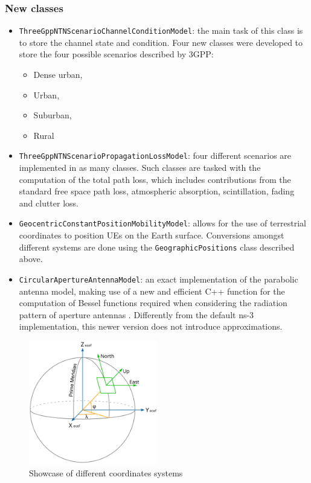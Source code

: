 \subsubsection{New classes}
\begin{itemize}
    \item \texttt{ThreeGppNTNScenarioChannelConditionModel}: the main task of this class is to store the channel state and condition. Four new classes were developed to store the four possible scenarios described by \ac{3GPP}:
    \begin{itemize}
        \item Dense urban,
        \item Urban,
        \item Suburban,
        \item Rural
    \end{itemize}
    \item \texttt{ThreeGppNTNScenarioPropagationLossModel}: four different scenarios are implemented in as many classes. Such classes are tasked with the computation of the total path loss, which includes contributions from the standard free space path loss, atmospheric absorption, scintillation, fading and clutter loss.
    \item \texttt{GeocentricConstantPositionMobilityModel}: allows for the use of terrestrial coordinates to position \ac{UE}s on the Earth surface. Conversions amongst different systems are done using the \texttt{GeographicPositions} class described above.
    \item \texttt{CircularApertureAntennaModel}: an exact implementation of the parabolic antenna model, making use of a new and efficient C++ function for the computation of Bessel functions required when considering the radiation pattern of aperture antennas \cite{rad-patterns}. Differently from the default ns-3 implementation, this newer version does not introduce approximations.
\end{itemize}




\begin{figure}[ht]
    \centering
    \includegraphics[width=0.5\textwidth]{res/coord_systems.png}
    \caption{Showcase of different coordinates systems \cite{wiki_coords}}
    \label{fig:coord-syst}
\end{figure}


